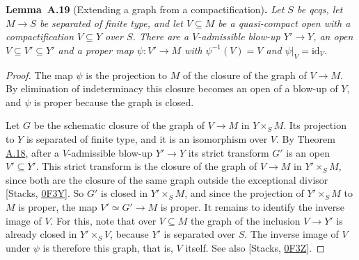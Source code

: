 \documentclass[11pt]{article}
\newenvironment{bpstatement}[2]{\par\addvspace{0.6\baselineskip}\noindent\textbf{#1}#2\textbf{.}\enspace\ignorespaces}
  {\par\addvspace{0.4\baselineskip}}
\newenvironment{bpstatementit}[2]{\begin{bpstatement}{#1}{#2}\itshape\ignorespaces}{\end{bpstatement}}
\begin{document}
\label{bp51}%
\begin{bpstatementit}{Lemma~A.19}{ (Extending a graph from a compactification)}
Let \(S\) be qcqs, let \(M\to S\) be separated of finite type, and let \(V\subseteq M\) be a quasi-compact open with a compactification \(V\subseteq Y\) over \(S\). There are a \(V\)-admissible blow-up \(Y'\to Y\), an open \(V\subseteq V'\subseteq Y'\) and a proper map \(\psi:V'\to M\) with \(\psi^{-1}(V)=V\) and \(\psi|_V=\mathrm{id}_V\).
\end{bpstatementit}

\begin{proof}[{Proof}]\label{bp52}%
The map \(\psi\) is the projection to \(M\) of the closure of the graph of \(V\to M\). By elimination of indeterminacy this closure becomes an open of a blow-up of \(Y\), and \(\psi\) is proper because the graph is closed.

Let \(G\) be the schematic closure of the graph of \(V\to M\) in \(Y\times_SM\). Its projection to \(Y\) is separated of finite type, and it is an isomorphism over \(V\). By Theorem \hyperref[bp48]{A.18}, after a \(V\)-admissible blow-up \(Y'\to Y\) its strict transform \(G'\) is an open \(V'\subseteq Y'\). This strict transform is the closure of the graph of \(V\to M\) in \(Y'\times_SM\), since both are the closure of the same graph outside the exceptional divisor [Stacks, \href{https://stacks.math.columbia.edu/tag/0F3Y}{0F3Y}]. So \(G'\) is closed in \(Y'\times_SM\), and since the projection of \(Y'\times_SM\) to \(M\) is proper, the map \(V'\simeq G'\to M\) is proper. It remains to identify the inverse image of \(V\). For this, note that over \(V\subseteq M\) the graph of the inclusion \(V\to Y'\) is already closed in \(Y'\times_SV\), because \(Y'\) is separated over \(S\). The inverse image of \(V\) under \(\psi\) is therefore this graph, that is, \(V\) itself. See also [Stacks, \href{https://stacks.math.columbia.edu/tag/0F3Z}{0F3Z}].
\end{proof}


\end{document}
